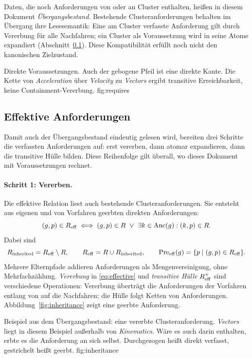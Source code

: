 Daten, die noch Anforderungen von oder an Cluster enthalten, heißen in
diesem Dokument \emph{Übergangsbestand}. Bestehende Clusteranforderungen
behalten im Übergang ihre Lesesemantik:
Eine am Cluster verfasste Anforderung gilt durch Vererbung für alle
Nachfahren; ein Cluster als Voraussetzung wird in seine Atome expandiert
(Abschnitt~\ref{sec:effective}).
Diese Kompatibilität erfüllt noch nicht den kanonischen Zielzustand.

{Direkte Voraussetzungen. Auch der gebogene Pfeil ist eine direkte Kante.
Die Kette von \emph{Acceleration} über \emph{Velocity} zu \emph{Vectors}
ergibt transitive Erreichbarkeit, keine Containment-Vererbung.}
{fig:requires}

\subsection{Effektive Anforderungen}
\label{sec:effective}
Damit auch der Übergangsbestand eindeutig gelesen wird, bereiten drei
Schritte die verfassten Anforderungen auf: erst vererben, dann atomar
expandieren, dann die transitive Hülle bilden. Diese Reihenfolge gilt
überall, wo dieses Dokument mit Voraussetzungen rechnet.

\paragraph{Schritt 1: Vererben.}
Die effektive Relation liest auch bestehende Clusteranforderungen. Sie
entsteht aus eigenen und von Vorfahren geerbten direkten Anforderungen:
\begin{equation}
 (g,p)\in R_{\mathrm{eff}}\iff
 (g,p)\in R\ \lor\ \exists k\in\operatorname{Anc}(g):(k,p)\in R.
 \label{eq:effective}
\end{equation}
Dabei sind
\[
 R_{\mathrm{inherited}}=R_{\mathrm{eff}}\setminus R,\qquad
 R_{\mathrm{eff}}=R\cup R_{\mathrm{inherited}},\qquad
 \operatorname{Pre}_{\mathrm{eff}}(g)=\{p\mid(g,p)\in R_{\mathrm{eff}}\}.
\]
Mehrere Elternpfade addieren Anforderungen als Mengenvereinigung, ohne
Mehrfachzählung. \emph{Vererbung} in \eqref{eq:effective} und
\emph{transitive Hülle} $R_{\mathrm{eff}}^+$ sind verschiedene Operationen:
Vererbung überträgt die Anforderungen der Vorfahren entlang von
 auf die Nachfahren; die Hülle folgt Ketten von Anforderungen.
Abbildung~\ref{fig:inheritance} zeigt eine geerbte Anforderung.

{Beispiel aus dem Übergangsbestand: eine vererbte Clusteranforderung.
\emph{Vectors} liegt in diesem Beispiel außerhalb von \emph{Kinematics}.
Wäre es auch darin enthalten, erbte es die Anforderung an sich selbst.
Durchgezogen heißt direkt verfasst, gestrichelt heißt geerbt.}
{fig:inheritance}


